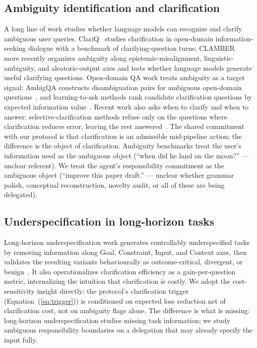 \subsection{Ambiguity identification and clarification}
\label{sec:related:ambiguity}

A long line of work studies whether language models can recognize and clarify ambiguous user queries. ClariQ~\cite{aliannejadi2020clariq} studies clarification in open-domain information-seeking dialogue with a benchmark of clarifying-question turns; CLAMBER~\cite{clamber2024} more recently organizes ambiguity along epistemic-misalignment, linguistic-ambiguity, and aleatoric-output axes and tests whether language models generate useful clarifying questions. Open-domain QA work treats ambiguity as a target signal: AmbigQA constructs disambiguation pairs for ambiguous open-domain questions~\cite{min2020ambigqa}, and learning-to-ask methods rank candidate clarification questions by expected information value~\cite{rao2018learn2ask}. Recent work also asks when to clarify and when to answer: selective-clarification methods refuse only on the questions where clarification reduces error, leaving the rest answered~\cite{lee2023selectiveambig, cole2023selectivelyambig}. The shared commitment with our protocol is that clarification is an admissible mid-pipeline action; the difference is the object of clarification. Ambiguity benchmarks treat the user's information need as the ambiguous object (``when did he land on the moon?'' --- unclear referent). We treat the agent's responsibility commitment as the ambiguous object (``improve this paper draft.'' --- unclear whether grammar polish, conceptual reconstruction, novelty audit, or all of these are being delegated).

\subsection{Underspecification in long-horizon tasks}
\label{sec:related:underspec}

Long-horizon underspecification work generates controllably underspecified tasks by removing information along Goal, Constraint, Input, and Context axes, then validates the resulting variants behaviourally as outcome-critical, divergent, or benign~\cite{lhaw2024}. It also operationalizes clarification efficiency as a gain-per-question metric, internalizing the intuition that clarification is costly. We adopt the cost-sensitivity insight directly: the protocol's clarification trigger (Equation~(\ref{eq:trigger})) is conditioned on expected loss reduction net of clarification cost, not on ambiguity flags alone. The difference is what is missing: long-horizon underspecification studies missing task information; we study ambiguous responsibility boundaries on a delegation that may already specify the input fully.

